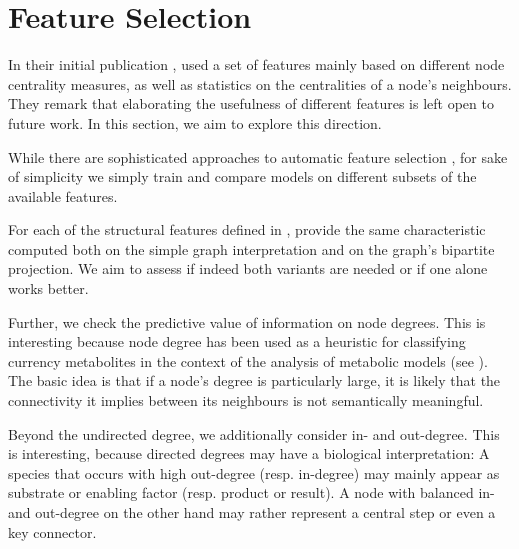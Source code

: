 \documentclass[
	fontsize=10pt, %
	twoside=false, %
	secnumdepth=1, %
  toc=indentunnumbered %
]{kaobook}
\begin{document}
\section{Feature Selection}
\label{sec:feature-selection}


In their initial publication \cite{nielsen_MachineLearningSupport_2019},
\nielsen{} used a set of features mainly based on different node centrality
measures, as well as statistics on the centralities of a node's neighbours. They
remark that elaborating the usefulness of different features is left open to
future work. In this section, we aim to explore this direction.

While there are sophisticated approaches to automatic feature selection  
\cite{saeys_ReviewFeatureSelection_2007},
for sake of simplicity we simply train and compare models on different subsets
of the available features.

For each of the structural features defined in ,
\nielsen{} provide the same characteristic computed both on the simple graph
interpretation and on the graph's bipartite projection. We aim to assess if
indeed both variants are needed or if one alone works better.

Further, we check the predictive value of information on node degrees.
This is interesting because node degree has been used as a heuristic for
classifying currency metabolites in the context of the analysis of metabolic
models (see ). The basic idea is that if a node's
degree is particularly large, it is likely that the connectivity it implies
between its neighbours is not semantically meaningful.

Beyond the undirected degree, we additionally consider in- and out-degree. This
is interesting, because directed degrees may have a biological interpretation: A
species that occurs with high out-degree (resp. in-degree) may mainly appear as
substrate or enabling factor (resp. product or result). A node with balanced in-
and out-degree on the other hand may rather represent a central step or even a
key connector.
\end{document}
